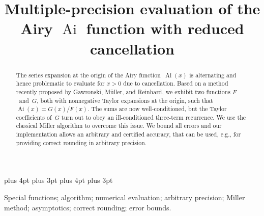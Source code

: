 \documentclass[10pt, conference]{IEEEtran}
\DeclareMathOperator{\Ai}{Ai}
\begin{document}
\setlength{\emergencystretch}{1em}
\abovedisplayskip=3pt plus 4pt
\abovedisplayshortskip=0pt plus 3pt
\belowdisplayskip=3pt plus 4pt
\belowdisplayshortskip=0pt plus 3pt
\setlength{\textfloatsep}{5pt} 
\setlength{\abovecaptionskip}{0pt}
\setlength{\belowcaptionskip}{0pt}

\title{Multiple-precision evaluation of the Airy $\Ai$ function with
reduced cancellation}
\author{
    \and
}
\maketitle


\begin{abstract}
The series expansion at the origin of the Airy function~$\Ai(x)$ is alternating and hence problematic to evaluate for $x > 0$ due to cancellation.
Based on a method recently proposed by Gawronski,
M\"uller, and Reinhard, we exhibit two functions $F$~and~$G$, both with
nonnegative Taylor expansions at the origin, such that $\Ai(x) = G (x)
/ F (x)$. The sums are now well-conditioned, but the Taylor coefficients
of~$G$ turn out to obey an ill-conditioned three-term recurrence. We use the
classical Miller algorithm to overcome this issue. We bound
all errors and our implementation allows an arbitrary and certified accuracy,
that can be used, e.g., for providing correct rounding in arbitrary precision.
\end{abstract}

\begin{IEEEkeywords}
Special functions; algorithm; numerical evaluation; arbitrary precision; Miller method; asymptotics; correct rounding; error bounds.
\end{IEEEkeywords}

\newcommand\mightbeomitted{}
\end{document}
